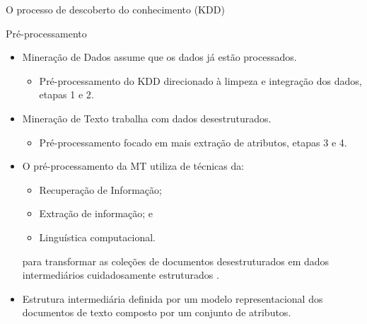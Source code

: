 \documentclass[%
  10pt,%
  aspectratio = 169,%
  compress,%
  t,%
]{beamer}%
\begin{document}
    \begin{frame}[fragile = singleslide]{}{O processo de descoberto do conhecimento (KDD)}
        
    \end{frame}

    \begin{frame}[fragile = singleslide]{}{Pré-processamento}
        \begin{itemize}
            \item Mineração de Dados assume que os dados já estão processados.
            \begin{itemize}
                \item Pré-processamento do KDD direcionado à limpeza e integração dos dados, etapas 1 e 2.
            \end{itemize}

            \item Mineração de Texto trabalha com dados desestruturados.
                \begin{itemize}
                    \item Pré-processamento focado em mais extração de atributos, etapas 3 e 4.
                \end{itemize}

            \item O pré-processamento da MT utiliza de técnicas da:
            \begin{itemize}
                \item Recuperação de Informação;
                \item Extração de informação; e
                \item Linguística computacional.
            \end{itemize}
            para transformar as coleções de documentos desestruturados em dados intermediários cuidadosamente estruturados \cite[p.~2--3]{Feldman:2006:TMH:1076381}.

            \item Estrutura intermediária definida por um modelo representacional dos documentos de texto composto por um conjunto de atributos.
        \end{itemize}
    \end{frame}
\end{document}

